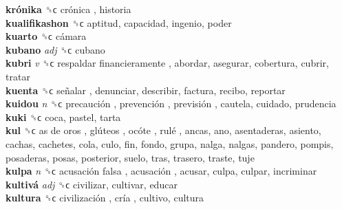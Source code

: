 \textbf{krónika} ␝ϲ   crónica , historia  \\
\textbf{kualifikashon} ␝ϲ  aptitud, capacidad, ingenio, poder  \\
\textbf{kuarto} ␝ϲ   cámara   \\
\textbf{kubano} \emph{adj}  ␝ϲ  cubano  \\
\textbf{kubri} \emph{v}  ␝ϲ   respaldar financieramente , abordar, asegurar, cobertura, cubrir, tratar  \\
\textbf{kuenta} ␝ϲ   señalar , denunciar, describir, factura, recibo, reportar  \\
\textbf{kuidou} \emph{n}  ␝ϲ   precaución ,  prevención ,  previsión , cautela, cuidado, prudencia  \\
\textbf{kuki} ␝ϲ  coca, pastel, tarta  \\
\textbf{kul} ␝ϲ   as de oros ,  glúteos ,  ocóte ,  rulé , ancas, ano, asentaderas, asiento, cachas, cachetes, cola, culo, fin, fondo, grupa, nalga, nalgas, pandero, pompis, posaderas, posas, posterior, suelo, tras, trasero, traste, tuje  \\
\textbf{kulpa} \emph{n}  ␝ϲ   acusación falsa ,  acusación , acusar, culpa, culpar, incriminar  \\
\textbf{kultivá} \emph{adj}  ␝ϲ  civilizar, cultivar, educar  \\
\textbf{kultura} ␝ϲ   civilización ,  cría , cultivo, cultura  \\
